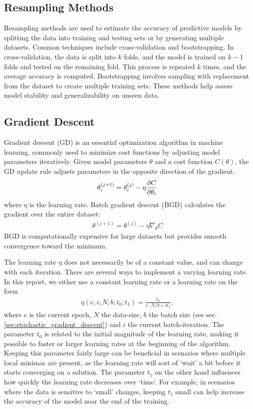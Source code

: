 \documentclass[%
reprint,s
amsmath,amssymb,
aps,
]{revtex4-2}
\begin{document}
\subsection{Resampling Methods}
Resampling methods are used to estimate the accuracy of predictive models by splitting the data into training and testing sets or by generating multiple datasets. Common techniques include cross-validation and bootstrapping. In cross-validation, the data is split into $k$ folds, and the model is trained on $k-1$ folds and tested on the remaining fold. This process is repeated $k$ times, and the average accuracy is computed. Bootstrapping involves sampling with replacement from the dataset to create multiple training sets. These methods help assess model stability and generalizability on unseen data.

\subsection{Gradient Descent}	\label{sec:gradient_descent}
Gradient descent (GD) is an essential optimization algorithm in machine learning, commonly used to minimize cost functions by adjusting model parameters iteratively. Given model parameters $\theta$ and a cost function $C(\theta)$, the GD update rule adjusts parameters in the opposite direction of the gradient:
\begin{align}
	\theta_i^{(j+1)}=\theta_i^{(j)}-\eta\pdv{C}{\theta_i}
\end{align}
where $\eta$ is the learning rate. Batch gradient descent (BGD) calculates the gradient over the entire dataset:
\begin{align}
	\theta^{(j+1)}=\theta^{(j)}-\eta\nabla_\theta C
\end{align}
BGD is computationally expensive for large datasets but provides smooth convergence toward the minimum.

The learning rate \(\eta\) does not necessarily be of a constant value, and can change with each iteration. There are several ways to implement a varying learning rate. In this report, we either use a constant learning rate or a learning rate on the form 
\begin{align} \label{eq:varyin_learning_rate}
	\eta(e,i;N;b;t_0;t_1) = \frac{t_0}{e\cdot N/b + i t_1},
\end{align}
where \(e\) is the current epoch, \(N\) the data-size, \(b\) the batch size (see sec. \ref{sec:stochastic_gradient_descent}) and \(i\) the current batch-iteration. The parameter \(t_0\) is related to the initial magnitude of the learning rate, making it possible to faster or larger learning rates at the beginning of the algorithm. Keeping this parameter fairly large can be beneficial in scenarios where multiple local minimas are present, as the learning rate will sort of  `wait' a bit before it starts converging on a solution. The parameter \(t_1\) on the other hand influences how quickly the learning rate decreases over `time'. For example, in scenarios where the data is sensitive to `small' changes, keeping \(t_1\) small can help increase the accuracy of the model near the end of the training. 
\end{document}
